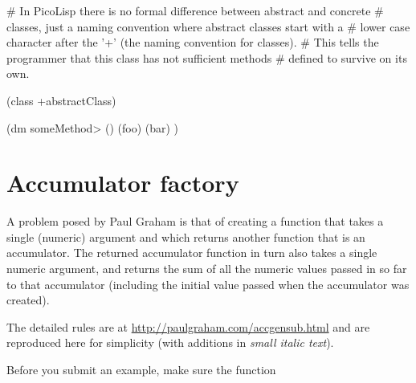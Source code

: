 \begin{wideverbatim}

# In PicoLisp there is no formal difference between abstract and concrete
# classes, just a naming convention where abstract classes start with a
# lower case character after the '+' (the naming convention for classes).
# This tells the programmer that this class has not sufficient methods
# defined to survive on its own.

(class +abstractClass)

(dm someMethod> ()
   (foo)
   (bar) )

\end{wideverbatim}

\pagebreak{}
\section*{Accumulator factory}


A problem posed by Paul Graham is that of creating a function that
takes a single (numeric) argument and which returns another function
that is an accumulator. The returned accumulator function in turn also
takes a single numeric argument, and returns the sum of all the
numeric values passed in so far to that accumulator (including the
initial value passed when the accumulator was created).

The detailed rules are at
\href{http://paulgraham.com/accgensub.html}{http://paulgraham.com/accgensub.html}
and are reproduced here for simplicity (with additions in \emph{small
  italic text}).

Before you submit an example, make sure the function

